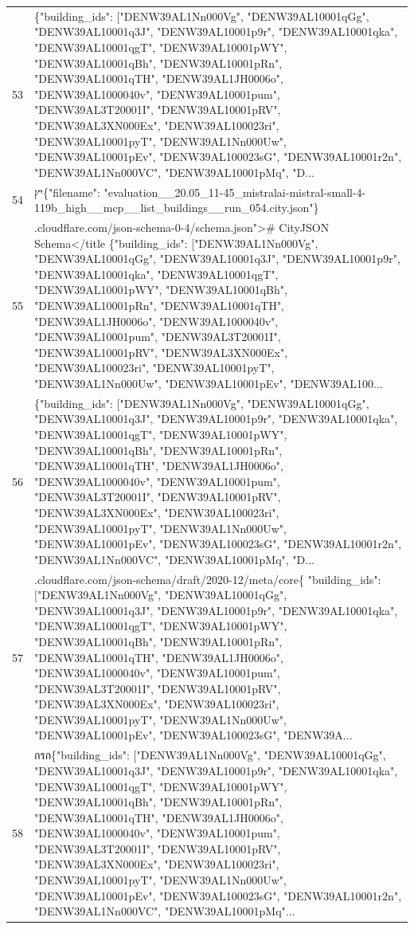 \documentclass[a4paper,11pt]{article}
\begin{document}
\begin{table}[ht]
\begin{tabular}{r p{12cm}}
53 & \{"building\_ids": ["DENW39AL1Nn000Vg", "DENW39AL10001qGg", "DENW39AL10001q3J", "DENW39AL10001p9r", "DENW39AL10001qka", "DENW39AL10001qgT", "DENW39AL10001pWY", "DENW39AL10001qBh", "DENW39AL10001pRn", "DENW39AL10001qTH", "DENW39AL1JH0006o", "DENW39AL1000040v", "DENW39AL10001pum", "DENW39AL3T20001I", "DENW39AL10001pRV", "DENW39AL3XN000Ex", "DENW39AL100023ri", "DENW39AL10001pyT", "DENW39AL1Nn000Uw", "DENW39AL10001pEv", "DENW39AL100023sG", "DENW39AL10001r2n", "DENW39AL1Nn000VC", "DENW39AL10001pMq", "D... \\
54 & יץ\{"filename": "evaluation\_\_20.05\_11-45\_mistralai-mistral-small-4-119b\_high\_\_mcp\_\_list\_buildings\_\_run\_054.city.json"\} \\
55 & .cloudflare.com/json-schema-0-4/schema.json">\# CityJSON Schema</title
\{"building\_ids": ["DENW39AL1Nn000Vg", "DENW39AL10001qGg", "DENW39AL10001q3J", "DENW39AL10001p9r", "DENW39AL10001qka", "DENW39AL10001qgT", "DENW39AL10001pWY", "DENW39AL10001qBh", "DENW39AL10001pRn", "DENW39AL10001qTH", "DENW39AL1JH0006o", "DENW39AL1000040v", "DENW39AL10001pum", "DENW39AL3T20001I", "DENW39AL10001pRV", "DENW39AL3XN000Ex", "DENW39AL100023ri", "DENW39AL10001pyT", "DENW39AL1Nn000Uw", "DENW39AL10001pEv", "DENW39AL100... \\
56 & \{"building\_ids": ["DENW39AL1Nn000Vg", "DENW39AL10001qGg", "DENW39AL10001q3J", "DENW39AL10001p9r", "DENW39AL10001qka", "DENW39AL10001qgT", "DENW39AL10001pWY", "DENW39AL10001qBh", "DENW39AL10001pRn", "DENW39AL10001qTH", "DENW39AL1JH0006o", "DENW39AL1000040v", "DENW39AL10001pum", "DENW39AL3T20001I", "DENW39AL10001pRV", "DENW39AL3XN000Ex", "DENW39AL100023ri", "DENW39AL10001pyT", "DENW39AL1Nn000Uw", "DENW39AL10001pEv", "DENW39AL100023sG", "DENW39AL10001r2n", "DENW39AL1Nn000VC", "DENW39AL10001pMq", "D... \\
57 & .cloudflare.com/json-schema/draft/2020-12/meta/core\{
  "building\_ids": ["DENW39AL1Nn000Vg", "DENW39AL10001qGg", "DENW39AL10001q3J", "DENW39AL10001p9r", "DENW39AL10001qka", "DENW39AL10001qgT", "DENW39AL10001pWY", "DENW39AL10001qBh", "DENW39AL10001pRn", "DENW39AL10001qTH", "DENW39AL1JH0006o", "DENW39AL1000040v", "DENW39AL10001pum", "DENW39AL3T20001I", "DENW39AL10001pRV", "DENW39AL3XN000Ex", "DENW39AL100023ri", "DENW39AL10001pyT", "DENW39AL1Nn000Uw", "DENW39AL10001pEv", "DENW39AL100023sG", "DENW39A... \\
58 &  กรก\{"building\_ids": ["DENW39AL1Nn000Vg", "DENW39AL10001qGg", "DENW39AL10001q3J", "DENW39AL10001p9r", "DENW39AL10001qka", "DENW39AL10001qgT", "DENW39AL10001pWY", "DENW39AL10001qBh", "DENW39AL10001pRn", "DENW39AL10001qTH", "DENW39AL1JH0006o", "DENW39AL1000040v", "DENW39AL10001pum", "DENW39AL3T20001I", "DENW39AL10001pRV", "DENW39AL3XN000Ex", "DENW39AL100023ri", "DENW39AL10001pyT", "DENW39AL1Nn000Uw", "DENW39AL10001pEv", "DENW39AL100023sG", "DENW39AL10001r2n", "DENW39AL1Nn000VC", "DENW39AL10001pMq"... \\

\end{tabular}
\end{table}
\end{document}
